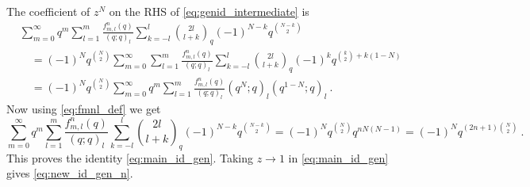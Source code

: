 \documentclass[a4paper,10pt]{article}
\newcommand{\tsf}[1]{\textsf{#1}}
\begin{document}
The coefficient of $z^N$ on the \tsf{RHS} of \eqref{eq:genid_intermediate} is
\begin{equation}\label{eq:RHS_zN_coeff}
\begin{aligned}
& \sum_{m=0}^{\infty}q^m\sum_{l=1}^m \frac{f^n_{m,l}(q)}{(q ; q)_l} \sum_{k=-l}^l{
2 l \choose
l+k}_q(-1)^{N-k} q^{\binom{N-k}{2}} \\
& \quad=(-1)^N q^{\binom{N}{2}} \sum_{m=0}^{\infty} \sum_{l=1}^m \frac{f^n_{m,l}(q)}{(q ; q)_l} \sum_{k=-l}^l{
2 l \choose
l+k}_q(-1)^k q^{\binom{k}{2}+k(1-N)} \\
& \quad=(-1)^N q^{\binom{N}{2}} \sum_{m=0}^\infty q^m \sum_{l=1}^m 
    \frac{f^n_{m,l}(q)}{(q;q)_l} (q^N; q)_l 
    (q^{1-N};q)_l ~.
\end{aligned}
\end{equation}
Now using \eqref{eq:fmnl_def} we get 
\begin{equation}
\sum_{m=0}^{\infty}q^m\sum_{l=1}^m \frac{f^n_{m,l}(q)}{(q ; q)_l} \sum_{k=-l}^l{
2 l \choose
l+k}_q(-1)^{N-k} q^{\binom{N-k}{2}} =(-1)^N q^{\binom{N}{2}}q^{nN(N-1)}=(-1)^Nq^{(2n+1){N\choose 2}}~.    
\end{equation}
This proves the identity \eqref{eq:main_id_gen}. Taking $z\to 1$ in \eqref{eq:main_id_gen} gives \eqref{eq:new_id_gen_n}. 
\end{document}
